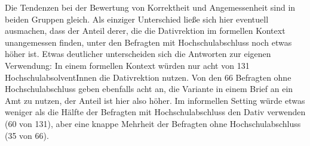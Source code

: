 Die Tendenzen bei der Bewertung von Korrektheit und Angemessenheit sind in beiden Gruppen gleich. 
Als einziger Unterschied ließe sich hier eventuell ausmachen, dass der Anteil derer, die die Dativrektion im formellen Kontext unangemessen finden, unter den Befragten mit Hochschulabschluss noch etwas höher ist. 
Etwas deutlicher unterscheiden sich die Antworten zur eigenen Verwendung: 
In einem formellen Kontext würden nur acht von 131 HochschulabsolventInnen die Dativrektion nutzen. 
Von den 66 Befragten ohne Hochschulabschluss geben ebenfalls acht an, die Variante in einem Brief an ein Amt zu nutzen, der Anteil ist hier also höher. 
Im informellen Setting würde etwas weniger als die Hälfte der Befragten mit Hochschulabschluss den Dativ verwenden (60 von 131), aber eine knappe Mehrheit der Befragten ohne Hochschulabschluss (35 von 66). 

